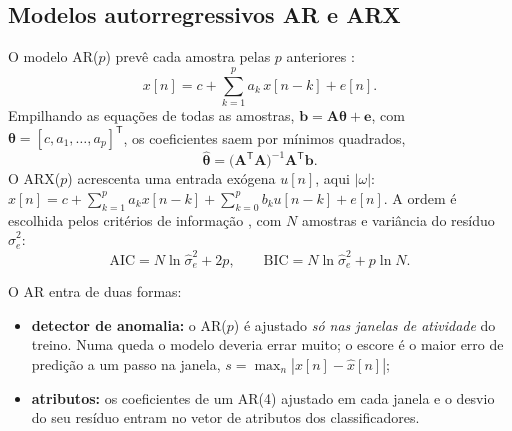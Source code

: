 \documentclass[12pt,a4paper]{article}
\newcommand{\wmag}{|\omega|}
\begin{document}
\subsection{Modelos autorregressivos AR e ARX}\label{sec:ar}
O modelo AR($p$) prevê cada amostra pelas $p$ anteriores \cite{box}:
\begin{equation}\label{eq:ar}
  x[n]=c+\sum_{k=1}^{p}a_k\,x[n-k]+e[n].
\end{equation}
Empilhando as equações de todas as amostras, $\mathbf b=\mathbf A\boldsymbol\theta+\mathbf e$,
com $\boldsymbol\theta=[c,a_1,\dots,a_p]^\mathsf T$, os coeficientes saem por mínimos
quadrados,
\begin{equation}\label{eq:mmq}
  \hat{\boldsymbol\theta}=\bigl(\mathbf A^\mathsf T\mathbf A\bigr)^{-1}\mathbf A^\mathsf T\mathbf b .
\end{equation}
O ARX($p$) acrescenta uma entrada exógena $u[n]$, aqui $\wmag$:
$x[n]=c+\sum_{k=1}^{p}a_kx[n-k]+\sum_{k=0}^{p}b_ku[n-k]+e[n]$. A ordem é escolhida pelos
critérios de informação \cite{akaike,schwarz}, com $N$ amostras e variância do resíduo
$\hat\sigma^2_e$:
\begin{equation}\label{eq:aic_bic}
  \text{AIC}=N\ln\hat\sigma^2_e+2p,\qquad \text{BIC}=N\ln\hat\sigma^2_e+p\ln N .
\end{equation}

O AR entra de duas formas:
\begin{itemize}[leftmargin=1.5em]
\item \textbf{detector de anomalia:} o AR($p$) é ajustado \emph{só nas janelas de
  atividade} do treino. Numa queda o modelo deveria errar muito; o escore é o maior erro
  de predição a um passo na janela, $s=\max_n|x[n]-\hat x[n]|$;
\item \textbf{atributos:} os coeficientes de um AR(4) ajustado em cada janela e o
  desvio do seu resíduo entram no vetor de atributos dos classificadores.
\end{itemize}
\end{document}
